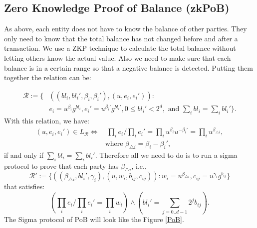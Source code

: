 \documentclass[10pt,fleqn]{article}
\begin{document}
\subsection{Zero Knowledge Proof of Balance (zkPoB)}
As above, each entity does not have to know the balance of other parties. They only need to know that the total balance has not changed before and after a transaction.  We use a ZKP technique to calculate the total balance without letting others know the actual value. Also we need to make sure that each balance is in a certain range so that a negative balance is detected. Putting them together the relation can be:

\[
\begin{split}
\mathcal{R} := \{& ((bl_i, bl_i', \beta_i, \beta_i'), (u, e_i, e_i')) : \\
& e_i = u^{\beta_i}g^{bl_i}, e_i' = u^{\beta_i'}g^{bl_i'}, 0 \le bl_i' < 2^d, \text{ and } \sum_i bl_i = \sum_i bl_i' \}.
\end{split}
\]
With this relation, we have:
\[
\begin{split}
(u, e_i, e_i') \in L_{\mathcal{R}} \Longleftrightarrow & \; \prod_i e_i / \prod_i e_i' = \prod_i u^{\beta_i} u^{-\beta_i'} = \prod_i u^{\beta_{\triangle
      i}}, \\ & \text{where } \beta_{\triangle i} = \beta_i -
  \beta_i',
\end{split}
\]
if and only if $\sum_i bl_i = \sum_i bl_i'$. Therefore all we need to
do is to run a sigma protocol to prove that each party has
$\beta_{\triangle i}$, i.e.,
\[
\mathcal{R}' := \{ ((\beta_{\triangle i}, bl_i', \gamma_i), (u, w_i,
b_{ij}, c_{ij})) : w_i = u^{\beta_{\triangle i}}, c_{ij} =
u^{\gamma_i} g^{b_{ij}} \}
\]
that satisfies:
\[
(\prod_i e_i / \prod_i e_i' = \prod_i w_i) \wedge (bl_i' = \sum_{j =
  0..d-1} 2^{j} b_{ij}).
\]
The Sigma protocol of PoB will look like the Figure \ref{PoB}.
\end{document}
